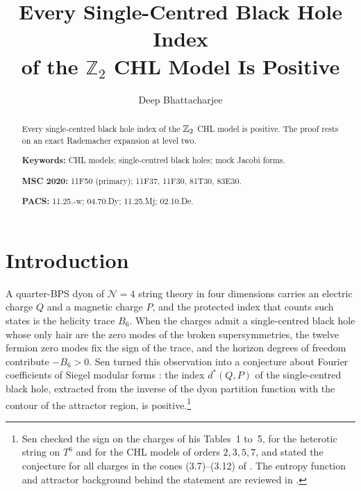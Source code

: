 \title[Single-centred indices of the $\ZZ_2$ CHL model]{Every Single-Centred Black Hole Index\\ of the $\mathbb Z_2$ CHL Model Is Positive}

\author{Deep Bhattacharjee}
\address{Formerly, Electro-Gravitational Space Propulsion Laboratory (EGSPL), Bhubaneswar, Odisha 751030, India}
\address{Formerly, University of Calcutta (Heramba Chandra College), 23/49 Gariahat Road, Golpark, Kolkata 700029, West Bengal, India}

\begin{abstract}
Every single-centred black hole index of the $\ZZ_2$ CHL model is positive. The proof rests on an exact Rademacher expansion at level two.

\medskip\noindent\textbf{Keywords:} CHL models; single-centred black holes; mock Jacobi forms.

\smallskip\noindent\textbf{MSC 2020:} 11F50 (primary); 11F37, 11F30, 81T30, 83E30.

\smallskip\noindent\textbf{PACS:} 11.25.-w; 04.70.Dy; 11.25.Mj; 02.10.De.
\end{abstract}

\maketitle

\section{Introduction}\label{sec:intro}

A quarter-BPS dyon of $\mathcal N=4$ string theory in four dimensions carries an electric charge $Q$ and a magnetic charge $P$, and the protected index that counts such states is the helicity trace $B_6$. When the charges admit a single-centred black hole whose only hair are the zero modes of the broken supersymmetries, the twelve fermion zero modes fix the sign of the trace, and the horizon degrees of freedom contribute $-B_6>0$. Sen turned this observation into a conjecture about Fourier coefficients of Siegel modular forms \cite{Sen11}: the index $d^*(Q,P)$ of the single-centred black hole, extracted from the inverse of the dyon partition function with the contour of the attractor region, is positive.\footnote{Sen checked the sign on the charges of his Tables~1 to~5, for the heterotic string on $T^6$ and for the CHL models of orders $2,3,5,7$, and stated the conjecture for all charges in the cones (3.7)--(3.12) of \cite{Sen11}. The entropy function and attractor background behind the statement are reviewed in \cite{Sen08}.}

